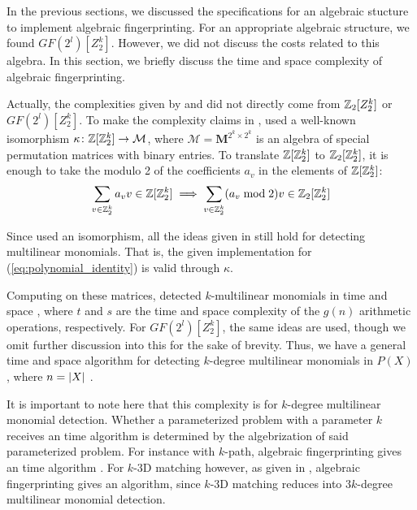 In the previous sections, we discussed the specifications 
for an algebraic stucture to implement algebraic fingerprinting. 
For an appropriate algebraic structure, we found $GF(2^{l})[Z_2^k]$. 
However, we did not discuss the costs related 
to this algebra. In this section, we briefly discuss the time and space complexity 
of algebraic fingerprinting.
%

Actually, the complexities given by \textcite{Koutis08} and 
\textcite{Williams09} did not directly come from 
$\mathbb Z_2[Z_2^k]$ or $GF(2^{l})[Z_2^k]$. 
To make the complexity claims in \cite{Koutis08}, 
\citeauthor{Koutis08} used a well-known \cite{Terras99} isomorphism 
$\kappa \colon \mathbb Z[\mathbb Z_2^k] \to \mathcal{M}$, where $\mathcal{M} = \mathbf{M}^{2^k \times 2^k}$ 
is an algebra of special permutation matrices with binary entries. To translate $\mathbb Z[\mathbb Z_2^k]$ to 
$\mathbb Z_2[\mathbb Z_2^k]$, it is enough to take the modulo 2 of the coefficients $a_v$ in 
the elements of $\mathbb Z[\mathbb Z_2^k]$: 
\[
  \sum_{v \in \mathbb Z_2^k}a_v v \in \mathbb Z[\mathbb Z_2^k] \implies 
  \sum_{v \in \mathbb Z_2^k}(a_v \bmod 2) v \in \mathbb Z_2[\mathbb Z_2^k]
\]

Since \citeauthor{Koutis08} 
used an isomorphism, all the ideas given in 
 still hold for 
detecting multilinear monomials. That is, 
the given implementation for (\ref{eq:polynomial_identity}) 
is valid through $\kappa$.

Computing on these matrices, 
\textcite{Koutis08} detected $k$-multilinear monomials 
in time  and space , where $t$ and $s$ are the time 
and space complexity of the $g(n)$ arithmetic operations, respectively. 
For $GF(2^{l})[Z_2^k]$, the same ideas are used, though we omit 
further discussion into this for the sake of brevity. 
Thus, we have a general 
 time and  space algorithm for detecting 
$k$-degree multilinear monomials in $P(X)$, where $n = {\left\vert X\right\vert}$ \cite{KouWil09}.

It is important to note here that this complexity is for $k$-degree 
multilinear monomial detection. Whether a parameterized problem with a parameter 
$k$ receives an  time algorithm is determined by the algebrization 
of said parameterized problem. 
For instance with $k$-path, algebraic fingerprinting gives an  
time algorithm \cite{Williams09}. 
For $k$-3D matching however, as given in , 
algebraic fingerprinting gives an  algorithm, since 
$k$-3D matching reduces into $3k$-degree multilinear monomial detection.


